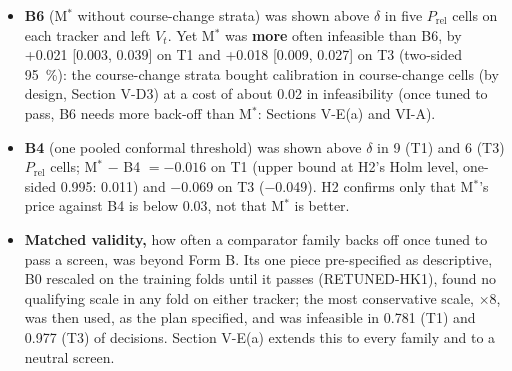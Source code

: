 \documentclass{ieeeaccess}
\begin{document}
\begin{itemize}
\item \textbf{B6} (M$^{*}$ without course-change strata) was shown above $\delta$ in five $P_{\mathrm{rel}}$ cells on each tracker and left $V_{t}$. Yet M$^{*}$ was \textbf{more} often infeasible than B6, by +0.021 [0.003, 0.039] on T1 and +0.018 [0.009, 0.027] on T3 (two-sided 95~\%): the course-change strata bought calibration in course-change cells (by design, Section V-D3) at a cost of about 0.02 in infeasibility (once tuned to pass, B6 needs more back-off than M$^{*}$: Sections V-E(a) and VI-A).
\item \textbf{B4} (one pooled conformal threshold) was shown above $\delta$ in 9 (T1) and 6 (T3) $P_{\mathrm{rel}}$ cells; M$^{*}$ $-$ B4 $= -0.016$ on T1 (upper bound at H2's Holm level, one-sided 0.995: 0.011) and $-$0.069 on T3 ($-$0.049). H2 confirms only that M$^{*}$'s price against B4 is below 0.03, not that M$^{*}$ is better.
\item \textbf{Matched validity,} how often a comparator family backs off once tuned to pass a screen, was beyond Form B. Its one piece pre-specified as descriptive, B0 rescaled on the training folds until it passes (RETUNED-HK1), found no qualifying scale in any fold on either tracker; the most conservative scale, $\times8$, was then used, as the plan specified, and was infeasible in 0.781 (T1) and 0.977 (T3) of decisions. Section V-E(a) extends this to every family and to a neutral screen.
\end{itemize}
\end{document}
